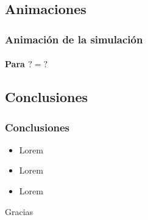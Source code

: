 \documentclass[hyperref={pdfpagelayout=SinglePage}]{beamer}
\begin{document}
\subsection{Animaciones}

\begin{frame}[plain]
\frametitle{Animación de la simulación}
\framesubtitle{Para $? = ?$}
\begin{figure}[H]
	\centering
\end{figure}
\end{frame}

\subsection{Conclusiones}

\begin{frame}
\frametitle{Conclusiones}
\begin{itemize}
	\item Lorem
	\item Lorem
	\item Lorem
\end{itemize}	
\end{frame} 

\begin{frame}[plain]
    \centering
	\Huge Gracias
\end{frame}
\end{document}

